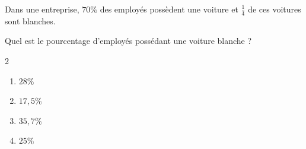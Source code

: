 \begin{exo}{}
	Dans une entreprise, $70\%$ des employés possèdent une voiture et $\frac{1}{4}$ de ces voitures sont blanches.


	Quel est le pourcentage d'employés possédant une voiture blanche ?

	\vspace*{-2mm}\begin{multicols}{2}
	\begin{enumerate}
		\item $28\%$
		\item $17,5$\%
		\item $35,7$\%
		\item $25\%$
	\end{enumerate}
	\end{multicols}\vspace*{-2mm}
\end{exo}
